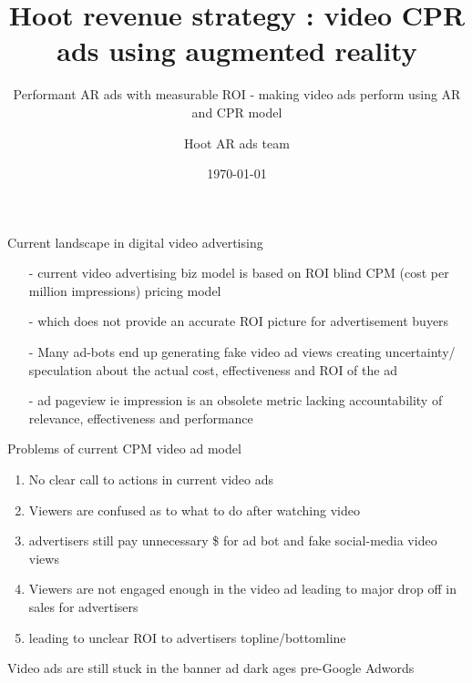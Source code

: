 \documentclass[12pt]{beamer}
\title{ Hoot revenue strategy : video CPR ads using augmented reality}
\subtitle{Performant AR ads with measurable ROI  - making video ads perform using AR and CPR model}
\date{\today}
\author{Hoot AR ads team}
\institute{Hoot Live inc., a Delaware C-corp}
\begin{document}
\maketitle



\begin{frame}[fragile]{Current landscape in digital video advertising}
  \begin{itemize}[<+-| alert@+>]%
	  
\item[-]current video advertising biz model is based on ROI blind CPM (cost per million impressions) pricing model
\item[-]which does not provide an accurate ROI picture for advertisement buyers
\item[-]Many ad-bots end up generating fake video ad views creating uncertainty/ speculation about the actual cost, effectiveness and ROI of the ad
\item[-]ad pageview ie impression is an obsolete metric lacking accountability of relevance, effectiveness and performance 
\end{itemize}

\end{frame}
\begin{frame}[t]{Problems of current CPM video ad model}
\begin{enumerate}[<+-| alert@+>]
\item No clear call to actions in current video ads
\item Viewers are confused as to what to do after watching video
\item advertisers still pay unnecessary \$ for ad bot  and fake social-media video views
\item Viewers are not engaged enough in the video ad leading to  major drop off in sales for advertisers
\item leading to unclear ROI to advertisers topline/bottomline
\end{enumerate}
\pause
Video ads are still stuck in the banner ad dark ages pre-Google Adwords

\end{frame}
\end{document}
